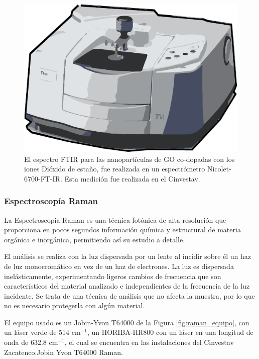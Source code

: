\documentclass[12pt]{article}
\begin{document}
        \begin{figure}[H]
            	   \begin{center}
             	  	\includegraphics[width = 0.5
                 \textwidth]{Imagenes/FTIR_EQUIPO.png}
             	  	\caption{El espectro FTIR para las nanopartículas de GO co-dopadas con los iones Dióxido de estaño, fue realizada en un espectrómetro Nicolet-6700-FT-IR. Esta medición fue realizada en el Cinvestav.}
                 \label{fig:FTIR_EQUIPO} 
            	    \end{center} 
                \end{figure}
        \subsubsection{Espectroscopía Raman} 
            La Espectroscopia Raman es una técnica fotónica de alta resolución que proporciona en pocos segundos información química y estructural de materia orgánica e inorgánica, permitiendo así su estudio a detalle.\vspace{1em} %
                
            El análisis se realiza con la luz dispersada por un lente al incidir sobre él un haz de luz monocromático en vez de un haz de electrones. La luz es dispersada inelásticamente, experimentando ligeros cambios de frecuencia que son característicos del material analizado e independientes de la frecuencia de la luz incidente. Se trata de una técnica de análisis que no afecta la muestra, por lo que no es necesario protegerla con algún material.  \cite{IEEEreferencias:Ref15}\vspace{1em} %
                
            El equipo usado es un Jobin-Yvon T64000 de la Figura \ref{fig:raman_equipo}, con un láser verde de 514 cm$^{-1}$, un HORIBA-HR800 con un láser en una longitud de onda de 632.8 cm$^{-1}$, el cual se encuentra en las instalaciones del Cinvestav Zacatenco.Jobin Yvon T64000 Raman.\vspace{1em} %
        
\end{document}
